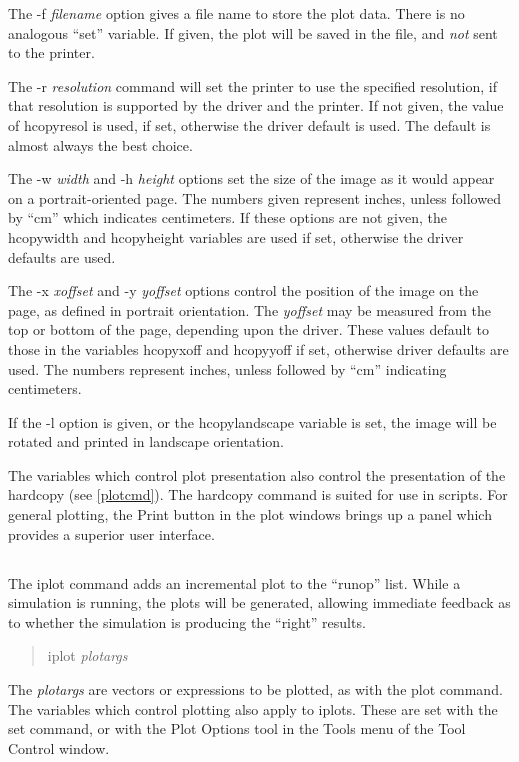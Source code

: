 The {\vt -f} {\it filename} option gives a file name to store the plot
data.  There is no analogous ``set'' variable.  If given, the plot
will be saved in the file, and {\it not} sent to the printer.

The {\vt -r} {\it resolution} command will set the printer to use the
specified resolution, if that resolution is supported by the driver
and the printer.  If not given, the value of {\et hcopyresol} is used,
if set, otherwise the driver default is used.  The default is almost
always the best choice.

The {\vt -w} {\it width} and {\vt -h} {\it height} options set the
size of the image as it would appear on a portrait-oriented page.  The
numbers given represent inches, unless followed by ``cm'' which
indicates centimeters.  If these options are not given, the {\et
hcopywidth} and {\et hcopyheight} variables are used if set, otherwise
the driver defaults are used.

The {\vt -x} {\it xoffset} and {\vt -y} {\it yoffset} options control
the position of the image on the page, as defined in portrait
orientation.  The {\it yoffset} may be measured from the top or bottom
of the page, depending upon the driver.  These values default to those
in the variables {\et hcopyxoff} and {\et hcopyyoff} if set, otherwise
driver defaults are used.  The numbers represent inches, unless
followed by ``cm'' indicating centimeters.

If the {\vt -l} option is given, or the {\et hcopylandscape} variable
is set, the image will be rotated and printed in landscape
orientation.

The variables which control plot presentation also control the
presentation of the hardcopy (see \ref{plotcmd}).  The hardcopy
command is suited for use in scripts.  For general plotting, the {\cb
Print} button in the {\cb plot} windows brings up a panel which
provides a superior user interface.
 
\subsection{}


The {\cb iplot} command adds an incremental plot to the ``runop'' list.
While a simulation is running, the plots will be generated, allowing
immediate feedback as to whether the simulation is producing the
``right'' results.
\begin{quote}\vt
iplot {\it plotargs}
\end{quote}
The {\it plotargs} are vectors or expressions to be plotted, as with
the {\cb plot} command.  The variables which control plotting also
apply to iplots.  These are set with the {\cb set} command, or with
the {\cb Plot Options} tool in the {\cb Tools} menu of the {\cb Tool
Control} window.

